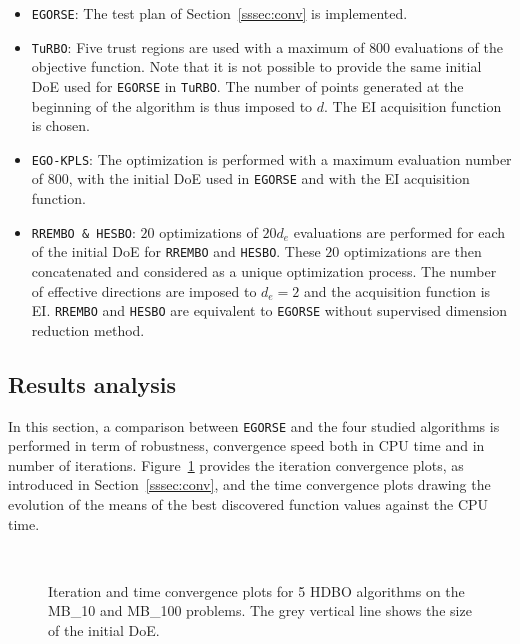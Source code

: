 \begin{itemize}
    \item \texttt{EGORSE}: The test plan of Section~\ref{sssec:conv} is implemented.
    \item  \texttt{TuRBO}: Five trust regions are used with a maximum of $800$ evaluations of the objective function. Note that it is not possible to provide the same initial DoE used for \texttt{EGORSE} in  \texttt{TuRBO}. The number of points generated at the beginning of the algorithm is thus imposed to $d$. The EI acquisition function is chosen.
     \item  \texttt{EGO-KPLS}: The optimization is performed with a maximum evaluation number of $800$, with the initial DoE used in \texttt{EGORSE} and with the EI acquisition function. 
     \item  \texttt{RREMBO \& HESBO}: $20$ optimizations of $20d_e$ evaluations are performed for each of the initial DoE for  \texttt{RREMBO} and  \texttt{HESBO}. These $20$ optimizations are then concatenated and considered as a unique optimization process. The number of effective directions are imposed to $d_e=2$ and the acquisition function is EI.  \texttt{RREMBO} and  \texttt{HESBO} are equivalent to \texttt{EGORSE} without supervised dimension reduction method.
\end{itemize}
\subsection{Results analysis}
\label{ssec:bo_mb:res}

In this section, a comparison between \texttt{EGORSE} and the four studied algorithms is performed in term of robustness, convergence speed both in CPU time and in number of iterations.
Figure~\ref{fig:ALL} provides the iteration convergence plots, as introduced in Section~\ref{sssec:conv}, and the time convergence plots drawing the evolution of the means of the best discovered function values against the CPU time. 
\begin{figure}[!hbtp]
    \centering
     \\
    \caption{Iteration and time convergence plots for 5 HDBO algorithms on the MB\_10 and MB\_100 problems. The grey vertical line shows the size of the initial DoE.}
    \label{fig:ALL}
\end{figure}

